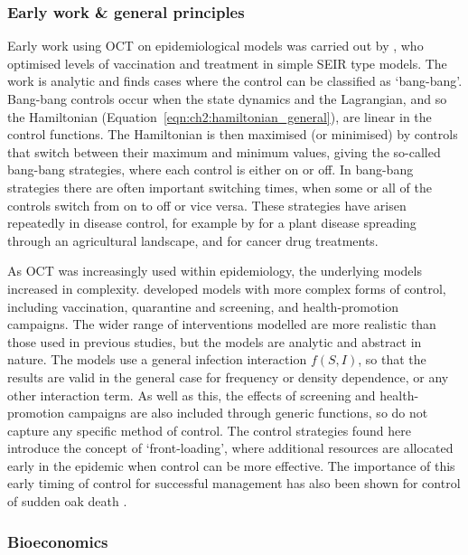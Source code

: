 \subsubsection{Early work \& general principles}

Early work using OCT on epidemiological models was carried out by \citet{sethi_optimal_1978}, who optimised levels of vaccination and treatment in simple SEIR type models. The work is analytic and finds cases where the control can be classified as `bang-bang'. Bang-bang controls occur when the state dynamics and the Lagrangian, and so the Hamiltonian (Equation~\ref{eqn:ch2:hamiltonian_general}), are linear in the control functions. The Hamiltonian is then maximised (or minimised) by controls that switch between their maximum and minimum values, giving the so-called bang-bang strategies, where each control is either on or off. In bang-bang strategies there are often important switching times, when some or all of the controls switch from on to off or vice versa. These strategies have arisen repeatedly in disease control, for example by \citet{forster_optimizing_2007} for a plant disease spreading through an agricultural landscape, and \citet{panetta_optimal_2003} for cancer drug treatments.

As OCT was increasingly used within epidemiology, the underlying models increased in complexity. \citet{behncke_optimal_2000} developed models with more complex forms of control, including vaccination, quarantine and screening, and health-promotion campaigns. The wider range of interventions modelled are more realistic than those used in previous studies, but the models are analytic and abstract in nature. The models use a general infection interaction $f(S, I)$, so that the results are valid in the general case for frequency or density dependence, or any other interaction term. As well as this, the effects of screening and health-promotion campaigns are also included through generic functions, so do not capture any specific method of control. The control strategies found here introduce the concept of `front-loading', where additional resources are allocated early in the epidemic when control can be more effective. The importance of this early timing of control for successful management has also been shown for control of sudden oak death \citep{cunniffe_modelling_2016}.

\subsubsection{Bioeconomics}


